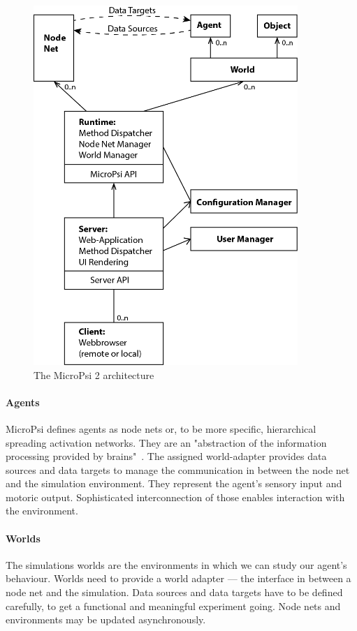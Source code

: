 \begin{figure}[h]
  \centering
    \includegraphics[width=10cm]{graphics/micropsi2_uml}
  \caption{The MicroPsi 2 architecture~\cite{conf/agi/Bach12}}
  \label{micropsi2_modules}
\end{figure}
            
        \paragraph{Agents}
MicroPsi defines agents as node nets or, to be more specific, hierarchical spreading activation networks. They are an "abstraction of the information processing provided by brains"~\cite{conf/agi/Bach12}. The assigned world-adapter provides data sources and data targets to manage the communication in between the node net and the simulation environment. They represent the agent's sensory input and motoric output. Sophisticated interconnection of those enables interaction with the environment.~\cite{conf/agi/Bach12}
       
        \paragraph{Worlds}
The simulations worlds are the environments in which we can study our agent's behaviour. Worlds need to provide a world adapter --- the interface in between a node net and the simulation. Data sources and data targets have to be defined carefully, to get a functional and meaningful experiment going. Node nets and environments may be updated asynchronously.~\cite{conf/agi/Bach12}

